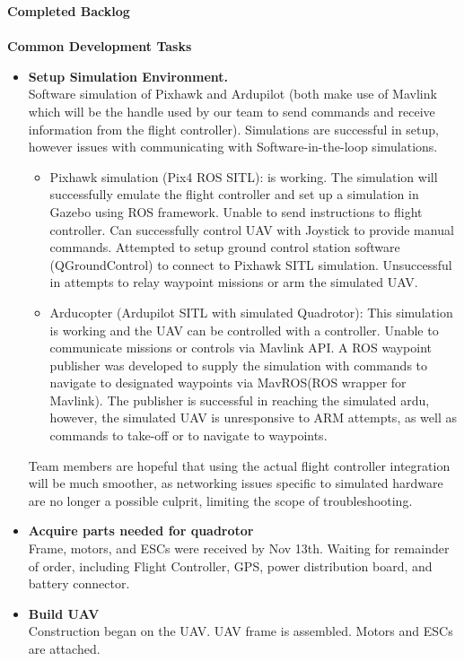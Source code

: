 \vspace{5mm}
\noindent\Large{\textbf{Completed Backlog}}\\
\vspace{2mm}\\
\large{\textbf{Common Development Tasks}}
\normalsize
\begin{itemize}
\item \textbf{Setup Simulation Environment.}\\
Software simulation of Pixhawk and Ardupilot (both make use of Mavlink which will be the handle used by our team to send commands and receive information from the flight controller). Simulations are successful in setup, however issues with communicating with Software-in-the-loop simulations.
\begin{itemize}
\item Pixhawk simulation (Pix4 ROS SITL): is working. The simulation will successfully emulate the flight controller and set up a simulation in Gazebo using ROS framework. Unable to send instructions to flight controller. Can successfully control UAV with Joystick to provide manual commands. Attempted to setup ground control station software (QGroundControl) to connect to Pixhawk SITL simulation. Unsuccessful in attempts to relay waypoint missions or arm the simulated UAV.
\item Arducopter (Ardupilot SITL with simulated Quadrotor): This simulation is working and the UAV can be controlled with a controller. Unable to communicate missions or controls via Mavlink API. A ROS waypoint publisher was developed to supply the simulation with commands to navigate to designated waypoints via MavROS(ROS wrapper for Mavlink). The publisher is successful in reaching the simulated ardu, however, the simulated UAV is unresponsive to ARM attempts, as well as commands to take-off or to navigate to waypoints.
\end{itemize}
Team members are hopeful that using the actual flight controller integration will be much smoother, as networking issues specific to simulated hardware are no longer a possible culprit, limiting the scope of troubleshooting.\\
\item \textbf{Acquire parts needed for quadrotor} \\
Frame, motors, and ESCs were received by Nov 13th. Waiting for remainder of order, including Flight Controller, GPS, power distribution board, and battery connector.
\item \textbf{Build UAV} \\
Construction began on the UAV. UAV frame is assembled. Motors and ESCs are attached. 
\end{itemize}

